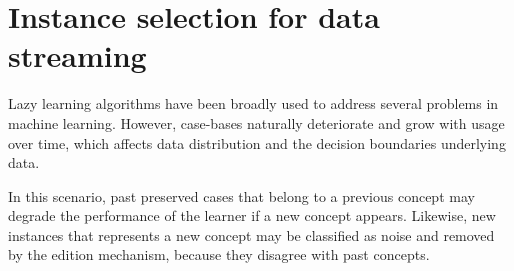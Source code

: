 \documentclass[preprint,12pt]{elsarticle}
\begin{document}


\section{Instance selection for data streaming}

Lazy learning algorithms have been broadly used to address several problems in machine learning. However, case-bases naturally deteriorate and grow with usage over time, which affects data distribution and the decision boundaries underlying data.

In this scenario, past preserved cases that belong to a previous concept may degrade the performance of the learner if a new concept appears. Likewise, new instances that represents a new concept may be classified as noise and removed by the edition mechanism, because they disagree with past concepts. 
\end{document}
